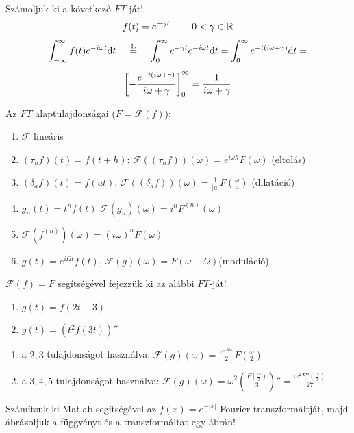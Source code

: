 \feladat Számoljuk ki a következő \fv{}$FT$-ját!
\begin{equation*}
   f(t)=e^{-\gamma t} \kh\kh 0<\gamma \in \mathbb{R}
\end{equation*}
\begin{gather*}
\mhint{-\infty}{\infty}{f(t) e^{-i\omega t}}{t} \opover{1.}{=}
\mhint{0}{\infty}{e^{-\gamma t}e^{-i\omega t}}{t} =
\mhint{0}{\infty}{e^{-t(i\omega + \gamma)}}{t} = \us
\mhpfv{0}{\infty}{ -\frac{ e^{ -t(i\omega + \gamma)}}{i\omega + \gamma} }=
\frac{1}{i\omega + \gamma}
\end{gather*}



\newpage
{}
Az $FT$ alaptulajdonságai ($F=\mathcal{F}(f)$):
\begin{enumerate}
\item $\mathcal{F}$ lineáris
\item $(\tau_{h}f)(t)=f(t+h)$: \kh $\mathcal{F}((\tau_{h}f))(\omega) = e^{i\omega h}F(\omega)$
\kh \hfill{}(eltolás)
\item $(\delta_{a}f)(t)=f(at)$: \kh $\mathcal{F}((\delta_{a}f))(\omega) =
\frac{1}{\vert a\vert}F(\frac{\omega}{a})$ \kh \hfill{}(dilatáció)
\item $g_{n}(t)=t^{n}f(t)$ \kh $\mathcal{F}(g_n)(\omega)=i^n F^{(n)}(\omega)$
\item $\mathcal{F}(f^{(n)})(\omega)=(i\omega)^n F(\omega)$
\item $g(t)=e^{i\Omega t}f(t)$, \kh $\mathcal{F}(g)(\omega)=F(\omega-\Omega)$\hfill{}(moduláció)
\end{enumerate}

\feladat $\mathcal{F}(f)=F$ segítségével fejezzük ki az alábbi  $FT$-ját!
\begin{enumerate}
\item $g(t)=f(2t-3)$
\item $g(t)=\left( t^2 f(3t)\right)''$
\end{enumerate}
\begin{enumerate}
\item a $2,3$ tulajdonságot használva: $\mathcal{F}(g)(\omega)=\frac{e^{-3i\omega}}{2}F(\frac{\omega}{2})$
\item a $3,4,5$ tulajdonságot használva: $\mathcal{F}(g)(\omega)= \omega^2\left( \frac{F(\frac{\omega}{3})}{3} \right)''=\frac{\omega^2 F''(\frac{\omega}{3})}{27}$
\end{enumerate}

\feladat Számítsuk ki Matlab segítségével az 
$f(x)=e^{-\vert x\vert}$
Fourier transzformáltját,
majd ábrázoljuk a függvényt és a transzformáltat egy ábrán!






